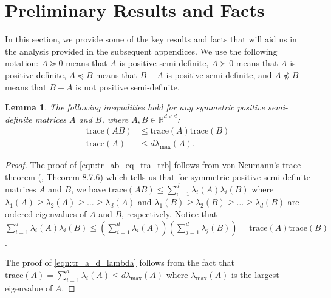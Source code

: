 \documentclass[letterpaper, 11 pt]{article}
\newcommand{\abslr}[1]{\left\lvert#1\right\rvert}
\newcommand{\tr}[1]{\text{trace}\left( #1 \right)}
\newtheorem{lemma}{Lemma}
\begin{document}
\section{Preliminary Results and Facts} \label{app:priliminary_results}
In this section, we provide some of the key results and facts that will aid us in the analysis provided in the subsequent appendices. We use the following notation: $ A \succeq 0$ means that $A$ is positive semi-definite, $A \succ 0$ means that $A$ is positive definite, $A \preceq B$ means that $B - A$ is positive semi-definite, and $A \not\preceq B$ means that $B - A$ is not positive semi-definite.
\begin{lemma}
    \label{lemma:trace_inequalities}
    The following inequalities hold for any symmetric positive semi-definite matrices $A$ and $B$, where $A, B \in \mathbb{R}^{d \times d}$:
    \begin{align}
        \tr{AB} &\leq \tr{A}\tr{B} \label{eqn:tr_ab_eq_tra_trb}\\
        \tr{A} &\leq d\lambda_{\max}(A) \label{eqn:tr_a_d_lambda}.
    \end{align}
\end{lemma}
\begin{proof}
    The proof of \eqref{eqn:tr_ab_eq_tra_trb} follows from von Neumann's trace theorem (\cite{horn2012matrix}, Theorem 8.7.6) which tells us that for symmetric positive semi-definite matrices $A$ and $B$, we have $\tr{AB} \leq \sum_{i = 1}^d \lambda_i(A) \lambda_i(B)$ where $\lambda_1(A) \geq \lambda_2(A) \geq \ldots \geq \lambda_d(A)$ and $\lambda_1(B) \geq \lambda_2(B) \geq \ldots \geq \lambda_d(B)$ are ordered eigenvalues of $A$ and $B$, respectively. Notice that $\sum_{i = 1}^d \lambda_i(A) \lambda_i(B) \leq \left(\sum_{i = 1}^d \lambda_i(A)\right) \left(\sum_{j = 1}^d \lambda_j(B)\right) = \tr{A}\tr{B}$.

    The proof of \eqref{eqn:tr_a_d_lambda} follows from the fact that $\tr{A} = \sum_{i = 1}^d \lambda_i(A) \leq d \lambda_{\max}(A)$ where $\lambda_{\max}(A)$ is the largest eigenvalue of $A$.
\end{proof}
\end{document}
